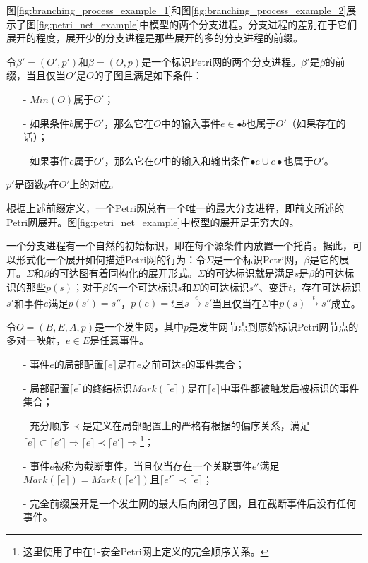 图\ref{fig:branching_process_example_1}和图\ref{fig:branching_process_example_2}展示了图\ref{fig:petri_net_example}中模型的两个分支进程。分支进程的差别在于它们展开的程度，展开少的分支进程是那些展开的多的分支进程的前缀。

\begin{definition}[分支进程前缀]\label{def:branching_process_prefix}
令$\beta'=(O',p')$和$\beta=(O,p)$是一个标识Petri网的两个分支进程。$\beta'$是$\beta$的前缀，当且仅当$O'$是$O$的子图且满足如下条件：
  \begin{itemize}
  	\item[-] $Min(O)$属于$O'$；
  	\item[-] 如果条件$b$属于$O'$，那么它在$O$中的输入事件$e\in\bullet b$也属于$O'$（如果存在的话）；
  	\item[-] 如果事件$e$属于$O'$，那么它在$O$中的输入和输出条件$\bullet e\cup e\bullet$也属于$O'$。
  \end{itemize}
  $p'$是函数$p$在$O'$上的对应。
\end{definition}

根据上述前缀定义，一个Petri网总有一个唯一的最大分支进程\cite{engelfriet1991branching}，即前文所述的Petri网展开。图\ref{fig:petri_net_example}中模型的展开是无穷大的。

一个分支进程有一个自然的初始标识，即在每个源条件内放置一个托肯。据此，可以形式化一个展开如何描述Petri网的行为：令$\Sigma$是一个标识Petri网，$\beta$是它的展开。$\Sigma$和$\beta$的可达图有着同构化的展开形式。$\Sigma$的可达标识就是满足$s$是$\beta$的可达标识的那些$p(s)$；对于$\beta$的一个可达标识$s$和$\Sigma$的可达标识$s''$、变迁$t$，存在可达标识$s'$和事件$e$满足$p(s')=s''$，$p(e)=t$且$s\overset{e}{\rightarrow}s'$当且仅当在$\Sigma$中$p(s)\overset{t}{\rightarrow}s''$成立。

\begin{definition}\label{def:cpu}
令$O=(B,E,A,p)$是一个发生网，其中$p$是发生网节点到原始标识Petri网节点的多对一映射，$e\in E$是任意事件。
  \begin{itemize}
  	\item[-] 事件$e$的局部配置$\lceil e\rceil$是在$e$之前可达$e$的事件集合；
  	\item[-] 局部配置$\lceil e\rceil$的终结标识$Mark(\lceil e\rceil)$是在$\lceil e\rceil$中事件都被触发后被标识的事件集合；
  	\item[-] 充分顺序$\prec$是定义在局部配置上的严格有根据的偏序关系，满足$\lceil e\rceil\subset\lceil e'\rceil\Rightarrow\lceil e\rceil\prec\lceil e'\rceil\Rightarrow$\footnote{这里使用了中在1-安全Petri网上定义的完全顺序关系。}；
  	\item[-] 事件$e$被称为截断事件，当且仅当存在一个关联事件$e'$满足$Mark(\lceil e\rceil)=Mark(\lceil e'\rceil)$且$\lceil e'\rceil\prec\lceil e\rceil$；
  	\item[-] 完全前缀展开是一个发生网的最大后向闭包子图，且在截断事件后没有任何事件。
  \end{itemize}
\end{definition}

